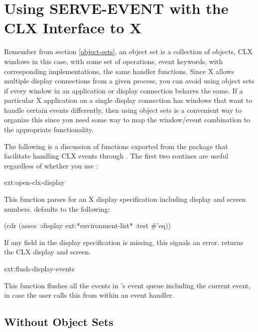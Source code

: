 \section{Using SERVE-EVENT with the CLX Interface to X}
\label{x-serve-mumbles}

Remember from section \ref{object-sets}, an object set is a collection of
objects, CLX windows in this case, with some set of operations, event keywords,
with corresponding implementations, the same handler functions.  Since X allows
multiple display connections from a given process, you can avoid using object
sets if every window in an application or display connection behaves the same.
If a particular X application on a single display connection has windows that
want to handle certain events differently, then using object sets is a
convenient way to organize this since you need some way to map the window/event
combination to the appropriate functionality.

The following is a discussion of functions exported from the 
package that facilitate handling CLX events through .
The first two routines are useful regardless of whether you use
:
\begin{defun}{ext:}{open-clx-display}{%
    }
  
  This function parses  for an X display specification
  including display and screen numbers.   defaults to the
  following:
  \begin{example}
    (cdr (assoc :display ext:*environment-list* :test #'eq))
  \end{example}
  If any field in the display specification is missing, this signals
  an error.   returns the CLX display and
  screen.
\end{defun}

\begin{defun}{ext:}{flush-display-events}{}
  
  This function flushes all the events in 's event queue
  including the current event, in case the user calls this from within
  an event handler.
\end{defun}



\subsection{Without Object Sets}

